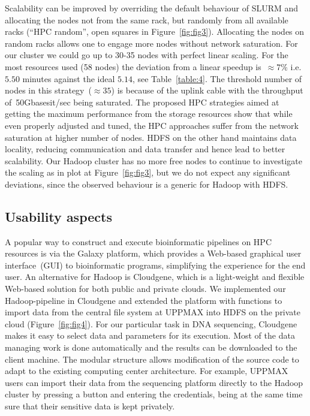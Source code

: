 \documentclass[10pt]{article}
\begin{document}
Scalability can be improved by overriding the default behaviour of SLURM and allocating the nodes not from the same rack, but randomly from all available racks (``HPC random'', open squares in Figure~\ref{fig:fig3}). Allocating the nodes on random racks allows one to engage more nodes without network saturation. For our cluster we could go up to 30-35 nodes with perfect linear scaling. For the most resources used (58 nodes) the deviation from a linear speedup is~$\approx 7\%$ i.e. $5.50$ minutes against the ideal $5.14$, see Table~\ref{table:4}. The threshold number of nodes in this strategy~($\approx35$) is because of the uplink cable with the throughput of~50Gbasesit/sec being saturated. 
The proposed HPC strategies aimed at getting the maximum performance from the storage resources show that while even properly adjusted and tuned, the HPC approaches suffer from the network saturation at higher number of nodes.
HDFS on the other hand maintains data locality, reducing communication and data transfer and hence lead to better scalability.
Our Hadoop cluster has no more free nodes to continue to investigate the scaling as in plot at Figure~\ref{fig:fig3}, but we do not expect any significant deviations, since the observed behaviour is a generic for Hadoop with HDFS\cite{lin2010, Hadoop:Guide}. 


\subsection*{Usability aspects}
\label{subsectionIV_2}

A popular way to construct and execute bioinformatic pipelines on HPC resources is via the Galaxy\cite{galaxy} platform, which provides a Web-based graphical user interface~(GUI) to bioinformatic programs, simplifying the experience for the end user. 
An alternative for Hadoop is Cloudgene\cite{cloudgene}, which is a light-weight and flexible Web-based solution for both public and private clouds. We implemented our Hadoop-pipeline in Cloudgene and extended the platform with functions to import data from the central file system at UPPMAX into HDFS on the private cloud (Figure~\ref{fig:fig4}).
For our particular task in DNA sequencing, Cloudgene makes it easy to select data and parameters for its execution. Most of the data managing work is done automatically and the results can be downloaded to the client machine. The modular structure allows modification of the source code to adapt to the existing computing center architecture. For example, UPPMAX users can import their data from the sequencing platform directly to the Hadoop cluster by pressing a button and entering the credentials, being at the same time sure that their sensitive data is kept privately.
\end{document}
